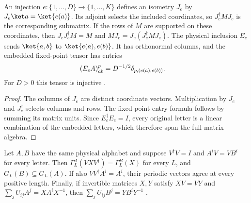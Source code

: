\begin{definition}
    \label{def:spt_coordinate_inclusions}
    \leanok
    An injection $e:\{1,\ldots,D\}\to\{1,\ldots,K\}$ defines an
    isometry $J_e$ by $J_e\ket a=\ket{e(a)}$. Its adjoint selects the
    included coordinates, so $J_e^\dagger M J_e$ is the corresponding
    submatrix. If the rows of $M$ are supported on these coordinates,
    then $J_eJ_e^\dagger M=M$ and $MJ_e=J_e(J_e^\dagger M J_e)$.
    The physical inclusion $E_e$ sends $\ket{a,b}$ to
    $\ket{e(a),e(b)}$. It has orthonormal columns, and the embedded
    fixed-point tensor has entries
    \begin{align}
        (E_e A)^p_{ab}
         & =D^{-1/2}\delta_{p,(e(a),e(b))}.\notag
    \end{align}
    For $D>0$ this tensor is injective
    \cite[Section~II.F.2]{Schuch2011Phases}.
\end{definition}

\begin{proof}\leanok
    The columns of $J_e$ are distinct coordinate vectors. Multiplication
    by $J_e$ and $J_e^\dagger$ selects columns and rows. The fixed-point
    entry formula follows by summing its matrix units. Since
    $E_e^\dagger E_e=I$, every original letter is a linear combination
    of the embedded letters, which therefore span the full matrix algebra.
\end{proof}

\begin{lemma}
    \label{thm:spt_isometric_bond_restriction}
    \leanok
    Let $A,B$ have the same physical alphabet and suppose
    $V^\dagger V=I$ and $A^iV=VB^i$ for every letter. Then
    $\Gamma_L^A(VXV^\dagger)=\Gamma_L^B(X)$ for every $L$, and
    $G_L(B)\subseteq G_L(A)$.
    If also $VV^\dagger A^i=A^i$, their periodic vectors agree at every
    positive length. Finally, if invertible matrices $X,Y$ satisfy
    $XV=VY$ and $\sum_jU_{ij}A^j=XA^iX^{-1}$, then
    $\sum_jU_{ij}B^j=YB^iY^{-1}$
    \cite[Section~II.F.2]{Schuch2011Phases}.
\end{lemma}

